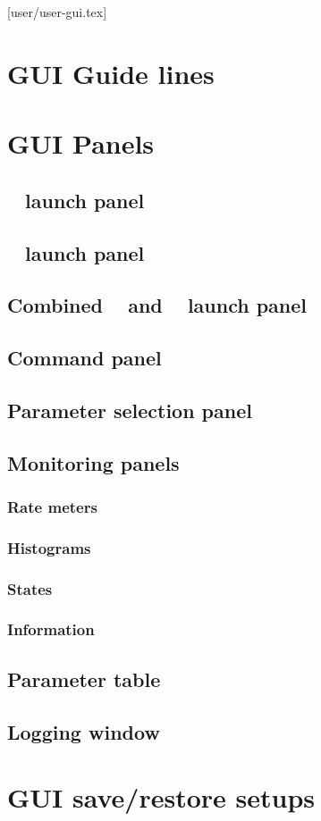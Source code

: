 [user/user-gui.tex]
\section{GUI Guide lines}
\section{GUI Panels}
\subsection{\dabc~ launch panel}
\subsection{\mbs~ launch panel}
\subsection{Combined \dabc~ and \mbs~ launch panel}
\subsection{Command panel}
\subsection{Parameter selection panel}
\subsection{Monitoring panels}
\subsubsection{Rate meters}
\subsubsection{Histograms}
\subsubsection{States}
\subsubsection{Information}
\subsection{Parameter table}
\subsection{Logging window}
\section{GUI save/restore setups}
